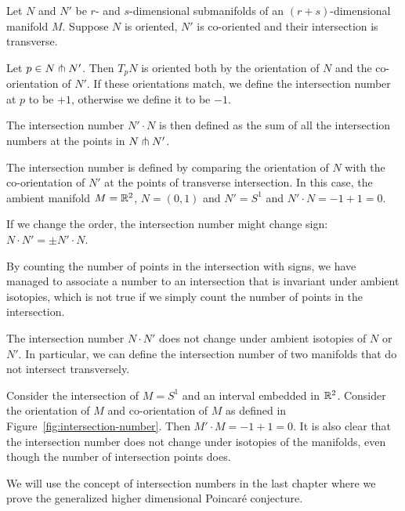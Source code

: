 \begin{definition}
    Let $N$ and  $N'$ be $r$- and  $s$-dimensional submanifolds of an $(r+s)$-dimensional manifold $M$.
    Suppose $N$ is oriented, $N'$ is co-oriented and their intersection is transverse.

    Let $p \in  N \pitchfork N'$.
    Then $T_p N$ is oriented both by the orientation of  $N$ and the co-orientation of  $N'$.
    If these orientations match, we define the intersection number at $p$ to be $+1$, otherwise we define it to be $-1$.

    The intersection number  $N' \cdot N$ is then defined as the sum of all the intersection numbers at the points in $N \pitchfork N'$.
\end{definition}
\begin{marginfigure}[-4cm]
    \centering
    \caption{
        The intersection number is defined by comparing the orientation of $N$ with the co-orientation of $N'$ at the points of transverse intersection.
        In this case, the ambient manifold $M = \mathbb{R}^2$, $N = (0,1)$ and $N' = S^1$ and $N' \cdot N = -1 + 1 = 0$.
    }
    \label{fig:intersection-number}
\end{marginfigure}
\begin{remark}
    If we change the order, the intersection number might change sign: $N \cdot N' =  \pm N' \cdot N$.
\end{remark}
By counting the number of points in the intersection with signs,
we have managed to associate a number to an intersection that is invariant under ambient isotopies, which is not true if we simply count the number of points in the intersection.
\begin{prop}
    The intersection number $N \cdot N'$ does not change under ambient isotopies of $N$ or $N'$.
    In particular, we can define the intersection number of two manifolds that do not intersect transversely.
\end{prop}
\begin{eg}
    Consider the intersection of $M  = S^{1}$ and an interval embedded in $\mathbb{R}^2$. Consider the orientation of $M$ and co-orientation of $M$ as defined in Figure~\ref{fig:intersection-number}. Then $M' \cdot M  = -1 + 1 = 0$.
    It is also clear that the intersection number does not change under isotopies of the manifolds, even though the number of intersection points does.
\end{eg}

We will use the concept of intersection numbers in the last chapter where we prove the generalized higher dimensional Poincaré conjecture.


